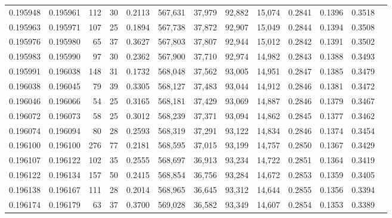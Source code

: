 \begin{tabular}{rrrrrrrrrrrrr}
0.195948 & 0.195961 &   112 &  30 &                                     0.2113 & 567,631 &  37,979 &  92,882 &  15,074 & 0.2841 & 0.1396 & 0.3518 \\
0.195963 & 0.195971 &   107 &  25 &                                     0.1894 & 567,738 &  37,872 &  92,907 &  15,049 & 0.2844 & 0.1394 & 0.3508 \\
0.195976 & 0.195980 &    65 &  37 &                                     0.3627 & 567,803 &  37,807 &  92,944 &  15,012 & 0.2842 & 0.1391 & 0.3502 \\
0.195983 & 0.195990 &    97 &  30 &                                     0.2362 & 567,900 &  37,710 &  92,974 &  14,982 & 0.2843 & 0.1388 & 0.3493 \\
0.195991 & 0.196038 &   148 &  31 &                                     0.1732 & 568,048 &  37,562 &  93,005 &  14,951 & 0.2847 & 0.1385 & 0.3479 \\
0.196038 & 0.196045 &    79 &  39 &                                     0.3305 & 568,127 &  37,483 &  93,044 &  14,912 & 0.2846 & 0.1381 & 0.3472 \\
0.196046 & 0.196066 &    54 &  25 &                                     0.3165 & 568,181 &  37,429 &  93,069 &  14,887 & 0.2846 & 0.1379 & 0.3467 \\
0.196072 & 0.196073 &    58 &  25 &                                     0.3012 & 568,239 &  37,371 &  93,094 &  14,862 & 0.2845 & 0.1377 & 0.3462 \\
0.196074 & 0.196094 &    80 &  28 &                                     0.2593 & 568,319 &  37,291 &  93,122 &  14,834 & 0.2846 & 0.1374 & 0.3454 \\
0.196100 & 0.196100 &   276 &  77 &                                     0.2181 & 568,595 &  37,015 &  93,199 &  14,757 & 0.2850 & 0.1367 & 0.3429 \\
0.196107 & 0.196122 &   102 &  35 &                                     0.2555 & 568,697 &  36,913 &  93,234 &  14,722 & 0.2851 & 0.1364 & 0.3419 \\
0.196122 & 0.196134 &   157 &  50 &                                     0.2415 & 568,854 &  36,756 &  93,284 &  14,672 & 0.2853 & 0.1359 & 0.3405 \\
0.196138 & 0.196167 &   111 &  28 &                                     0.2014 & 568,965 &  36,645 &  93,312 &  14,644 & 0.2855 & 0.1356 & 0.3394 \\
0.196174 & 0.196179 &    63 &  37 &                                     0.3700 & 569,028 &  36,582 &  93,349 &  14,607 & 0.2854 & 0.1353 & 0.3389 \\

\end{tabular}
